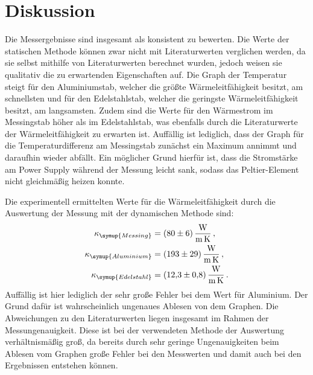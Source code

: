 \section{Diskussion}
\label{sec:Diskussion}
Die Messergebnisse sind insgesamt als konsistent zu bewerten.
Die Werte der statischen Methode können zwar nicht mit Literaturwerten verglichen werden,
da sie selbst mithilfe von Literaturwerten berechnet wurden, jedoch weisen sie
qualitativ die zu erwartenden Eigenschaften auf. Die Graph der Temperatur steigt für
den Aluminiumstab, welcher die größte Wärmeleitfähigkeit besitzt, am schnellsten und
für den Edelstahlstab, welcher die geringste Wärmeleitfähigkeit besitzt, am langsamsten.
Zudem sind die Werte für den Wärmestrom im Messingstab höher als im Edelstahlstab,
was ebenfalls durch die Literaturwerte der Wärmeleitfähigkeit zu erwarten ist.
Auffällig ist lediglich, dass der Graph für die Temperaturdifferenz am Messingstab
zunächst ein Maximum annimmt und daraufhin wieder abfällt. Ein möglicher Grund hierfür
ist, dass die Stromstärke am Power Supply während der Messung leicht sank, sodass
das Peltier-Element nicht gleichmäßig heizen konnte.


Die experimentell ermittelten Werte für die Wärmeleitfähigkeit durch die Auswertung
der Messung mit der dynamischen Methode sind:
\begin{align}
  \kappa_{\symup{Messing}} &= \SI{80(6)}{\watt\per\meter\per\kelvin}\,,\nonumber \\
  \kappa_{\symup{Aluminium}} &= \SI{193(29)}{\watt\per\meter\per\kelvin}\,,\nonumber \\
  \kappa_{\symup{Edelstahl}} &= \SI{12.3(08)}{\watt\per\meter\per\kelvin}\,.\nonumber
\end{align}
Auffällig ist hier lediglich der sehr große Fehler bei dem Wert für Aluminium. Der Grund dafür
ist wahrscheinlich ungenaues Ablesen von dem Graphen.
Die Abweichungen zu den Literaturwerten liegen insgesamt im Rahmen der Messungenauigkeit.
Diese ist bei der verwendeten Methode der Auswertung verhältnismäßig groß, da bereits
durch sehr geringe Ungenauigkeiten beim Ablesen vom Graphen große Fehler bei den
Messwerten und damit auch bei den Ergebnissen entstehen können.
